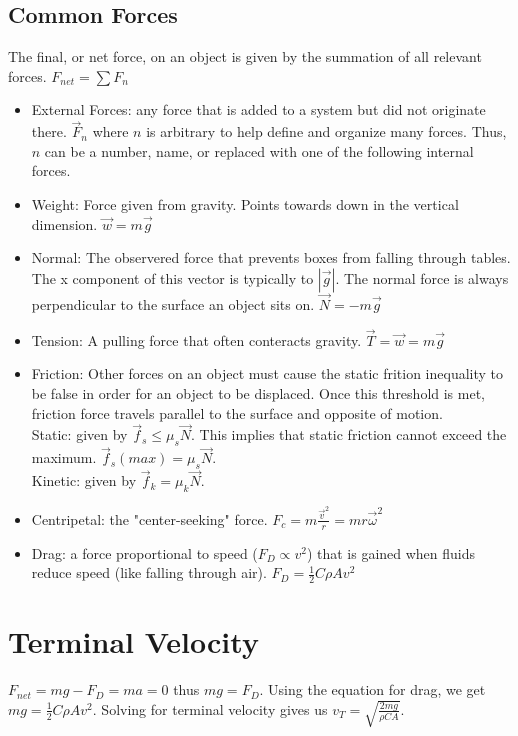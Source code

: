 \documentclass{article}
\begin{document}
\subsection{Common Forces}
The final, or net force, on an object is given by the summation of all relevant forces. $F_{net} = \sum F_n$
\begin{itemize}
  \item External Forces: any force that is added to a system but did not originate there. $\vec{F}_n$ where $n$ is arbitrary to help define and organize many forces. Thus, $n$ can be a number, name, or replaced with one of the following internal forces.
  \item Weight: Force given from gravity. Points towards down in the vertical dimension. $\vec{w} = m\vec{g}$
  \item Normal: The observered force that prevents boxes from falling through tables. The x component of this vector is typically to $|\vec{g}|$. The normal force is always perpendicular to the surface an object sits on. $\vec{N} = -m\vec{g}$
  \item Tension: A pulling force that often conteracts gravity. $\vec{T} = \vec{w} = m\vec{g}$
  \item Friction: Other forces on an object must cause the static frition inequality to be false in order for an object to be displaced. Once this threshold is met, friction force travels parallel to the surface and opposite of motion.\\
  Static: given by $\vec{f}_s \leq \mu_s\vec{N}$. This implies that static friction cannot exceed the maximum. $\vec{f}_s(max) = \mu_s\vec{N}$.\\
  Kinetic: given by $\vec{f}_k = \mu_k\vec{N}$.
  \item Centripetal: the "center-seeking" force. $F_c = m\frac{\vec{v}^2}{r} = mr\vec{\omega}^2$
  \item Drag: a force proportional to speed ($F_D \propto v^2$) that is gained when fluids reduce speed (like falling through air). $F_D = \frac{1}{2}C\rho Av^2$
\end{itemize}

\section{Terminal Velocity}
$F_{net} = mg - F_D = ma = 0$ thus $mg = F_D$. Using the equation for drag, we get $mg = \frac{1}{2}C\rho Av^2$. Solving for terminal velocity gives us $v_T = \sqrt{\frac{2mg}{\rho CA}}$.
\end{document}
